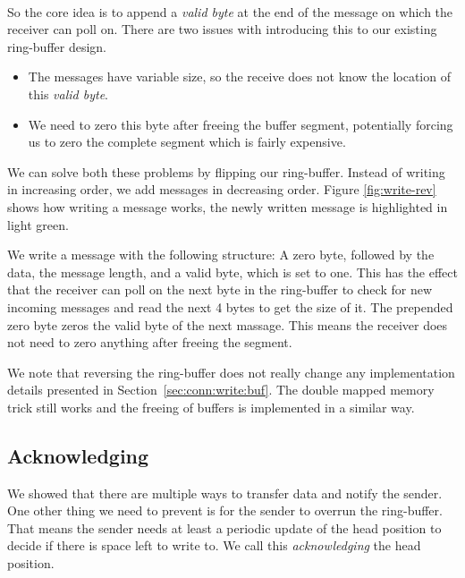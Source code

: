 \paragraph{} So the core idea is to append a \emph{valid byte} at the end of the message on which the receiver can poll on.
There are two issues with introducing this to our existing ring-buffer design.

\begin{itemize}
  \item The messages have variable size, so the receive does not know the location of this \emph{valid byte}.
  \item We need to zero this byte after freeing the buffer segment, potentially forcing us to zero the complete segment 
    which is fairly expensive.
\end{itemize}

We can solve both these problems by flipping our ring-buffer. Instead of writing in increasing order, we add messages in 
decreasing order. Figure \ref{fig:write-rev} shows how writing a message works, the newly written message is highlighted in 
light green. 

We write a message with the following structure: 
A zero byte, followed by the data, the message length, and a valid byte, which is set to one. This has the effect that the
receiver can poll on the next byte in the ring-buffer to check for new incoming messages and read the next 4 bytes to get 
the size of it. The prepended zero byte zeros the valid byte of the next massage. This means the receiver does not 
need to zero anything after freeing the segment.




We note that reversing the ring-buffer does not really change any implementation details presented in 
Section~\ref{sec:conn:write:buf}. The double mapped memory trick still works and the freeing of buffers is implemented in a
similar way.

\subsection{Acknowledging}

We showed that there are multiple ways to transfer data and notify the sender. One other thing we need to prevent is for the
sender to overrun the ring-buffer. That means the sender needs at least a periodic update of the head position to decide if
there is space left to write to. We call this \emph{acknowledging} the head position.

